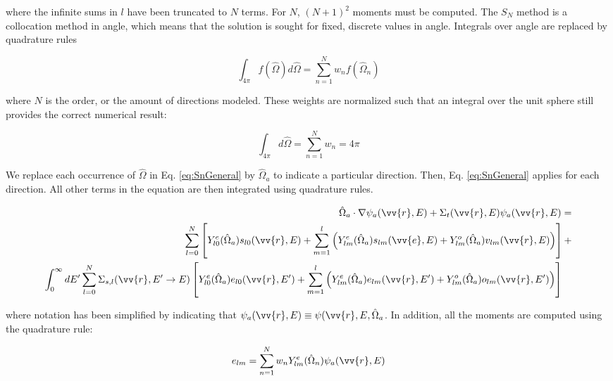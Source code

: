 \documentclass[10pt]{article}
\newcommand{\hO}{\hat{\Omega}}
\begin{document}
\begin{flushleft}
where the infinite sums in \(l\) have been truncated to \(N\) terms. For \(N\), \((N+1)^2\) moments must be computed. The \(S_N\) method is a collocation method in angle, which means that the solution is sought for fixed, discrete values in angle. Integrals over angle are replaced by quadrature rules

\begin{equation}
\label{eq:multigroupTE2}
\int_{4\pi}^{} f(\hO  )d\hO   = \sum_{n=1}^{N} w_n f(\hO  _n)
\end{equation}

where \(N\) is the order, or the amount of directions modeled. These weights are normalized such that an integral over the unit sphere still provides the correct numerical result:

\begin{equation}
\label{eq:QuadratureNormalization}
\int_{4\pi}^{}d\hO  =\sum_{n=1}^{N} w_n =4\pi
\end{equation}

We replace each occurrence of \(\hO  \) in Eq. \eqref{eq:SnGeneral} by \(\hO  _a\) to indicate a particular direction. Then, Eq. \eqref{eq:SnGeneral} applies for each direction. All other terms in the equation are then integrated using quadrature rules. 

\begin{equation}
\label{eq:SnGeneral}
\begin{aligned}
 \hO  _a\cdot\nabla\psi_a(\vv{r}, E) + 
 \Sigma_t(\vv{r},E)\psi_a(\vv{r}, E) = \\
\sum_{l=0}^{N}\left\lbrack Y_{l0}^e(\hO  _a)s_{l0}(\vv{r},E)+\sum_{m=1}^{l}\left(Y_{lm}^e(\hO  _a)s_{lm}(\vv{e},E)+Y_{lm}^o(\hO  _a)v_{lm}(\vv{r},E)\right)\right\rbrack+\\
\int_{0}^{\infty}dE' \sum_{l=0}^{N}\Sigma_{s,l}(\vv{r}, E'\rightarrow E)\left\lbrack Y_{l0}^e(\hO  _a)e_{l0}(\vv{r},E')+\sum_{m=1}^{l}\left(Y_{lm}^e(\hO  _a)e_{lm}(\vv{r},E')+Y_{lm}^o(\hO  _a)o_{lm}(\vv{r},E')\right)\right\rbrack\quad\\
\end{aligned}
\end{equation}

where notation has been simplified by indicating that \(\psi_a(\vv{r},E)\equiv\psi(\vv{r},E,\hO  _a\). In addition, all the moments are computed using the quadrature rule:

\begin{equation}
e_{lm}=\sum_{n=1}^{N} w_nY_{lm}^e(\hO  _n)\psi_a(\vv{r},E)
\end{equation}


\end{flushleft}
\end{document}
